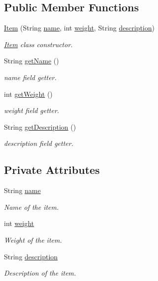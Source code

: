\subsection*{Public Member Functions}
\begin{DoxyCompactItemize}
\item 
\hyperlink{classpkg__world_1_1Item_a57474f01fd9f40be8d01edc1ad79171c}{Item} (String \hyperlink{classpkg__world_1_1Item_a69341bebf4daf5856e2bc03f9530bfc8}{name}, int \hyperlink{classpkg__world_1_1Item_aa5dd085ecf4205cb6e2b316ab5509731}{weight}, String \hyperlink{classpkg__world_1_1Item_a4fc495152cec2a97508ed5c1749b887f}{description})
\begin{DoxyCompactList}\small\item\em \hyperlink{classpkg__world_1_1Item}{Item} class constructor. \end{DoxyCompactList}\item 
String \hyperlink{classpkg__world_1_1Item_a2ac9495ef1a08f01df7f66a46ca895c2}{get\-Name} ()
\begin{DoxyCompactList}\small\item\em name field getter. \end{DoxyCompactList}\item 
int \hyperlink{classpkg__world_1_1Item_a4e4d16b3d657683d482e4e131f8d0571}{get\-Weight} ()
\begin{DoxyCompactList}\small\item\em weight field getter. \end{DoxyCompactList}\item 
String \hyperlink{classpkg__world_1_1Item_a2fb9a737f363fe6c0a50280c8630fcd0}{get\-Description} ()
\begin{DoxyCompactList}\small\item\em description field getter. \end{DoxyCompactList}\end{DoxyCompactItemize}
\subsection*{Private Attributes}
\begin{DoxyCompactItemize}
\item 
String \hyperlink{classpkg__world_1_1Item_a69341bebf4daf5856e2bc03f9530bfc8}{name}
\begin{DoxyCompactList}\small\item\em Name of the item. \end{DoxyCompactList}\item 
int \hyperlink{classpkg__world_1_1Item_aa5dd085ecf4205cb6e2b316ab5509731}{weight}
\begin{DoxyCompactList}\small\item\em Weight of the item. \end{DoxyCompactList}\item 
String \hyperlink{classpkg__world_1_1Item_a4fc495152cec2a97508ed5c1749b887f}{description}
\begin{DoxyCompactList}\small\item\em Description of the item. \end{DoxyCompactList}\end{DoxyCompactItemize}


